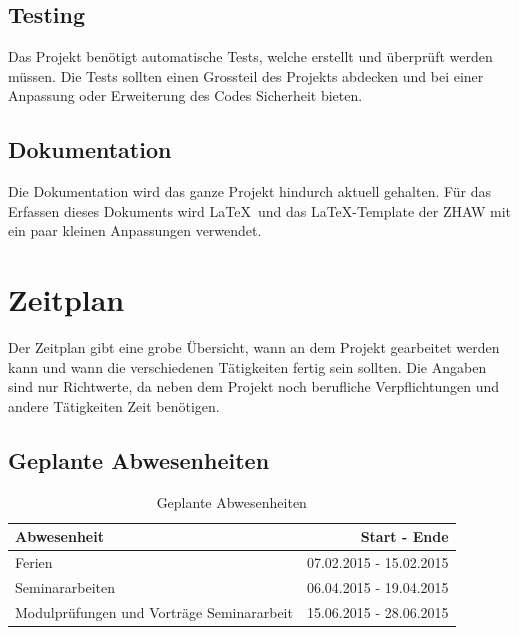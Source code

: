 \subsection{Testing}\label{testing}
Das Projekt benötigt automatische Tests, welche erstellt und überprüft werden müssen. Die Tests sollten einen Grossteil des Projekts abdecken und bei einer Anpassung oder Erweiterung des 
Codes Sicherheit bieten.

\subsection{Dokumentation}\label{dokumentation}
Die Dokumentation wird das ganze Projekt hindurch aktuell gehalten. Für das Erfassen dieses Dokuments wird \LaTeX\ und das \LaTeX-Template der ZHAW \cite{zhaw_latex_template} mit ein 
paar kleinen Anpassungen verwendet.

\section{Zeitplan}\label{zeitplan}
Der Zeitplan gibt eine grobe Übersicht, wann an dem Projekt gearbeitet werden kann und wann die verschiedenen Tätigkeiten fertig sein sollten. Die Angaben sind nur Richtwerte, da neben dem 
Projekt noch berufliche Verpflichtungen und andere Tätigkeiten Zeit benötigen.

\subsection{Geplante Abwesenheiten}
\begin{table}[ht]
\centering
  \begin{tabular}{ l | r }
	\hline
	\rowcolor{gray}
	\textbf{Abwesenheit}					&	\textbf{Start - Ende}	\\ \hline
	Ferien								&	07.02.2015 - 15.02.2015	\\ \hline
	Seminararbeiten						&	06.04.2015 - 19.04.2015	\\ \hline
	Modulprüfungen und Vorträge Seminararbeit		&	15.06.2015 - 28.06.2015	\\ \hline
  \end{tabular}
   \caption{Geplante Abwesenheiten}\label{table:holidays}
\end{table}

